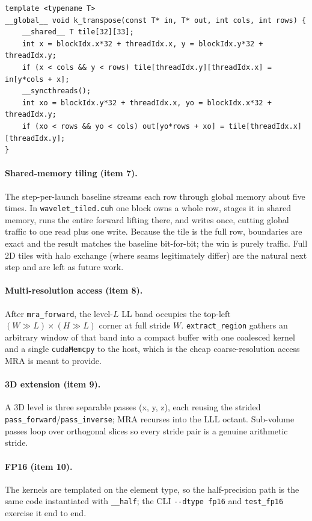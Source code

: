 \documentclass[11pt]{article}
\newcommand{\code}[1]{\texttt{#1}}
\begin{document}
\begin{lstlisting}[caption={Padded-tile transpose used by the coalesced column pass.},label=lst:transpose]
template <typename T>
__global__ void k_transpose(const T* in, T* out, int cols, int rows) {
    __shared__ T tile[32][33];
    int x = blockIdx.x*32 + threadIdx.x, y = blockIdx.y*32 + threadIdx.y;
    if (x < cols && y < rows) tile[threadIdx.y][threadIdx.x] = in[y*cols + x];
    __syncthreads();
    int xo = blockIdx.y*32 + threadIdx.x, yo = blockIdx.x*32 + threadIdx.y;
    if (xo < rows && yo < cols) out[yo*rows + xo] = tile[threadIdx.x][threadIdx.y];
}
\end{lstlisting}

\paragraph{Shared-memory tiling (item 7).}
The step-per-launch baseline streams each row through global memory about five
times. In \code{wavelet\_tiled.cuh} one block owns a whole row, stages it in shared
memory, runs the entire forward lifting there, and writes once, cutting global
traffic to one read plus one write. Because the tile is the full row, boundaries
are exact and the result matches the baseline bit-for-bit; the win is purely
traffic. Full 2D tiles with halo exchange (where seams legitimately differ) are the
natural next step and are left as future work.

\paragraph{Multi-resolution access (item 8).}
After \code{mra\_forward}, the level-$L$ \textsf{LL} band occupies the top-left
$(W\!\gg\!L)\times(H\!\gg\!L)$ corner at full stride $W$. \code{extract\_region}
gathers an arbitrary window of that band into a compact buffer with one coalesced
kernel and a single \code{cudaMemcpy} to the host, which is the cheap
coarse-resolution access MRA is meant to provide.

\paragraph{3D extension (item 9).}
A 3D level is three separable passes (x, y, z), each reusing the strided
\code{pass\_forward}/\code{pass\_inverse}; MRA recurses into the \textsf{LLL}
octant. Sub-volume passes loop over orthogonal slices so every stride pair is a
genuine arithmetic stride.

\paragraph{FP16 (item 10).}
The kernels are templated on the element type, so the half-precision path is the
same code instantiated with \code{\_\_half}; the CLI \code{-{}-dtype fp16} and
\code{test\_fp16} exercise it end to end.
\end{document}
